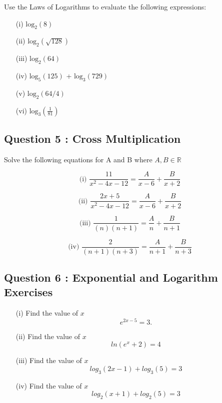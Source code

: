 \documentclass[]{article}
\begin{document}
\bigskip
\large
\noindent Use the Laws of Logarithms to evaluate the following expressions:

	\begin{multicols}{2}
		\begin{itemize}
		\item[(i)] $\mbox{log}_2(8)$
		\item[(ii)] $\mbox{log}_2(\sqrt{128})$
		\item[(iii)] $\mbox{log}_2(64)$
		\item[(iv)] $\mbox{log}_5(125)$ +   $\mbox{log}_3(729)$
		\item[(v)] $\mbox{log}_2(64/4)$
		\item[(vi)] $\mbox{log}_3(\frac{1}{81})$
				\end{itemize}
		\end{multicols}
	\subsection*{Question 5 : Cross Multiplication}
	Solve the following equations for A and B where $A,B \in \mathbb{R}$
	\begin{multicols}{2}
	\[ \mbox{(i)     } \frac{11}{x^2 - 4x - 12} = \frac{A}{x-6} + \frac{B}{x+2}\]
	
	\[ \mbox{(ii)    }\frac{2x + 5}{x^2 - 4x - 12} = \frac{A}{x-6} + \frac{B}{x+2}\]
	
	\[ \mbox{(iii)     }  \frac{1}{(n)(n+1)} = \frac{A}{n} + \frac{B}{n+1}\]
	
	\[ \mbox{(iv)    }\frac{2}{(n+1)(n+3)} = \frac{A}{n+1} + \frac{B}{n+3}\]
	\end{multicols}
\newpage\subsection*{Question 6 : Exponential and Logarithm Exercises}

\begin{multicols}{2}
\begin{itemize}
	\item[(i)] Find the value of $x$
	\[e^{2x-5} = 3. \]
		
	\item[(ii)] Find the value of $x$
	\[ln(e^x+2) = 4\]
	
	\item[(iii)] Find the value of $x$
	\[log_3(2x - 1) + log_3(5) = 3\]
	
	\item[(iv)] Find the value of $x$
	\[log_2(x + 1) + log_2(5) = 3\]
\end{itemize}
\end{multicols}
\end{document}
